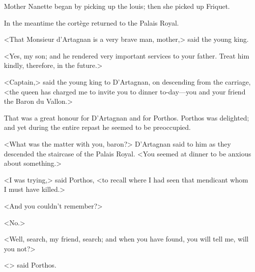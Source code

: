 Mother Nanette began by picking up the louis; then she picked up Friquet.

In the meantime the cortège returned to the Palais Royal.

<That Monsieur d'Artagnan is a very brave man, mother,> said the young king.

<Yes, my son; and he rendered very important services to your father. Treat him kindly, therefore, in the future.>

<Captain,> said the young king to D'Artagnan, on descending from the carriage, <the queen has charged me to invite you to dinner to-day—you and your friend the Baron du Vallon.>

That was a great honour for D'Artagnan and for Porthos. Porthos was delighted; and yet during the entire repast he seemed to be preoccupied.

<What was the matter with you, baron?> D'Artagnan said to him as they descended the staircase of the Palais Royal. <You seemed at dinner to be anxious about something.>

<I was trying,> said Porthos, <to recall where I had seen that mendicant whom I must have killed.>

<And you couldn't remember?>

<No.>

<Well, search, my friend, search; and when you have found, you will tell me, will you not?>

<> said Porthos. 